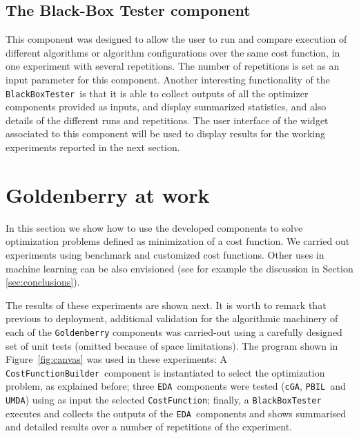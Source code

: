 \documentclass{sig-alternate}
\newcommand{\PBIL}{\texttt{PBIL}}
\newcommand{\UMDA}{\texttt{UMDA}}
\newcommand{\cGA}{\texttt{cGA}}
\newcommand{\EDA}{\texttt{EDA}}
\newcommand{\CostFunction}{\texttt{CostFunctionBuilder}}
\newcommand{\BBTester}{\texttt{BlackBoxTester}}
\newcommand{\figref}[1]{\mbox{Figure \ref{#1}}}
\begin{document}
\subsection{The Black-Box Tester component}
This component was designed to allow the user to run and compare execution of different algorithms or algorithm configurations over the same cost function, in one experiment with several repetitions. The number of repetitions is set as an input parameter for this component. Another interesting functionality of the \BBTester~is that it is able to collect outputs of all the optimizer components provided as inputs, and display summarized statistics, and also details of the different runs and repetitions. The user interface of the widget associated to this component will be used to display results for the working experiments reported in the next section.

\section{Goldenberry at work}
\label{sec:experiments}
In this section we show how to use the developed components to solve optimization problems defined as minimization of a cost function. We carried out experiments using benchmark and customized cost functions. Other uses in machine learning can be also envisioned (see for example the discussion in Section \ref{sec:conclusions}).

The results of these experiments are shown next. It is worth to remark that previous to deployment, additional validation for the algorithmic machinery of each of the \texttt{Golden\-berry} components was carried-out using a carefully designed set of unit tests (omitted because of space limitations). The program shown in \figref{fig:canvas} was used in these experiments: A \CostFunction~component is instantiated to select the optimization problem, as explained before; three \EDA~components were tested (\cGA, \PBIL~and \UMDA) using as input the selected \texttt{CostFunction}; finally, a \BBTester~\\executes and collects the outputs of the \EDA~components and shows summarised and detailed results over a number of repetitions of the experiment.
\end{document}
